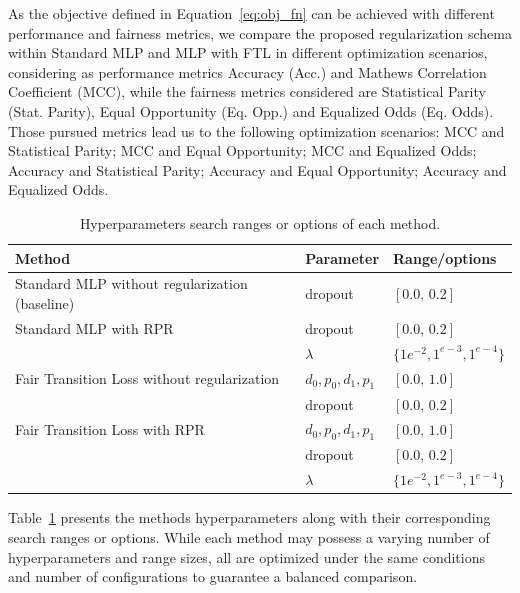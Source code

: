 As the objective defined in Equation~\ref{eq:obj_fn} can be achieved with different performance and fairness metrics, we compare the proposed regularization schema within Standard MLP and MLP with FTL in different optimization scenarios, considering as performance metrics Accuracy (Acc.) and Mathews Correlation Coefficient (MCC), while the fairness metrics considered are Statistical Parity (Stat. Parity), Equal Opportunity (Eq. Opp.) and Equalized Odds (Eq. Odds). Those pursued metrics lead us to the following optimization scenarios: MCC and Statistical Parity; MCC and Equal Opportunity; MCC and Equalized Odds; Accuracy and Statistical Parity; Accuracy and Equal Opportunity; Accuracy and Equalized Odds.

\begin{table}[ht]
\centering
\caption{Hyperparameters search ranges or options of each method.}\label{tab:hyperparameters_rpr}
{\footnotesize
\begin{tabular}{lll}
\toprule
Method & Parameter & Range/options \\ \midrule
 Standard MLP without regularization (baseline) & dropout & $[0.0,\,0.2]$  \vspace{1ex} \\
 Standard MLP with RPR & dropout & $[0.0,\,0.2]$  \vspace{1ex} \\
 & $\lambda$ & $\{1e^{-2}, 1^{e-3}, 1^{e-4}\}$ \\
 Fair Transition Loss without regularization & $d_0,p_0,d_1,p_1$ & $[0.0,\,1.0]$ \\
 &  dropout & $[0.0,\,0.2]$ \\
 Fair Transition Loss with RPR & $d_0,p_0,d_1,p_1$ & $[0.0,\,1.0]$ \\
 &  dropout & $[0.0,\,0.2]$ \\
 & $\lambda$ & $\{1e^{-2}, 1^{e-3}, 1^{e-4}\}$ \\
\bottomrule
\end{tabular}
}
\end{table}

Table~\ref{tab:hyperparameters_rpr} presents the methods hyperparameters along with their corresponding search ranges or options. While each method may possess a varying number of hyperparameters and range sizes, all are optimized under the same conditions and number of configurations to guarantee a balanced comparison.

